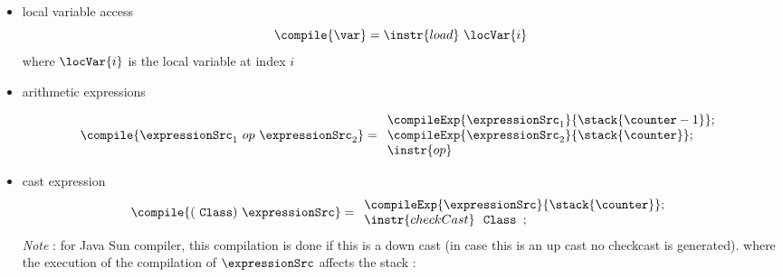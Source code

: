 \begin{itemize}
   \item local variable access
     $$\compile{ \var } =  \instr{load} \ \locVar{i} $$ 
   where $\locVar{i} $ is the local variable at index $i$


                
   \item arithmetic expressions
     
     $$\compile{ \expressionSrc_1 \ op \ \expressionSrc_2 } = 
                 \begin{array}{l}
                       \compileExp{ \expressionSrc_1}{  \stack{\counter -1 }  } ; \\
                       \compileExp{ \expressionSrc_2}{ \stack{\counter }  }; \\
                       \instr{op}
                 \end{array}     
                $$ 
                       

   \item cast expression 
     $$ \compile{ (\mbox{ \rm \texttt{Class}}   ) \ \expressionSrc } = 
              \begin{array}{l}  
                 \compileExp{\expressionSrc}{\stack{\counter}};\\
                   \instr{checkCast } \ \mbox{ \rm \texttt{Class }} ;
              \end{array}
$$
	       \textit{Note} : for Java Sun compiler, this compilation is done if this is a down cast (in case this is an up cast no checkcast is generated).
 	     where the execution of the compilation of $\expressionSrc$ affects the stack :         


\end{itemize}

